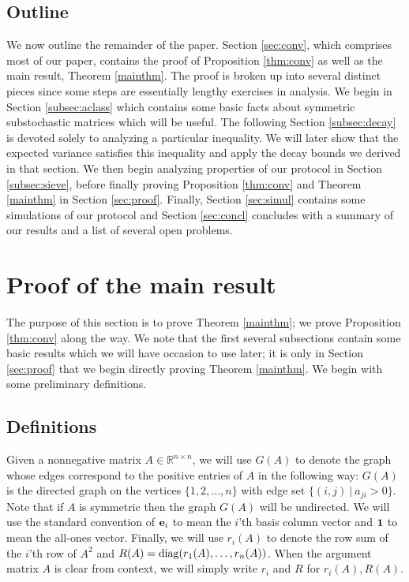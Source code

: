 \documentclass[final]{siamltex}
\begin{document}
\subsection{Outline} We now outline the remainder of the paper. Section \ref{sec:conv}, which comprises most of our paper, contains the proof of Proposition \ref{thm:conv} as well as the main result, Theorem \ref{mainthm}. The proof is broken up into several distinct pieces since some steps 
are essentially lengthy exercises in analysis. We begin in Section \ref{subsec:aclass} which contains some basic facts about symmetric substochastic
matrices which will be useful. The following Section \ref{subsec:decay} is devoted solely to analyzing a particular inequality. We will later show 
that the expected variance satisfies this inequality and apply the decay bounds we derived in that section.  We 
then begin analyzing properties of our protocol in Section \ref{subsec:sieve}, before finally proving Proposition \ref{thm:conv} and Theorem \ref{mainthm} in Section \ref{sec:proof}.  Finally, Section \ref{sec:simul} contains some simulations of our protocol and
Section \ref{sec:concl} concludes with a summary of our results and a list of several open problems. 
 
 
\section{Proof of the main result\label{sec:conv}} 

The purpose of this section is to prove Theorem \ref{mainthm}; we prove Proposition \ref{thm:conv} along the way.  
We note that the first several subsections contain some basic results which
we will have occasion to use later; it is only in Section \ref{sec:proof} that we begin directly proving Theorem \ref{mainthm}.
We begin with some preliminary definitions. 

 

\subsection{Definitions}
Given a nonnegative matrix $A \in {\mathbb{R}}^{n \times n}$, we will use $G(A)$ to
denote the graph whose edges correspond to the positive entries of $A$ in the following way: $G(A)$ is the directed graph on the vertices
$\{1,2, \ldots, n\}$ with edge set $\{ (i,j) ~|~ a_{ji}>0 \}$.  Note that if $A$ is symmetric then the graph $G(A)$ will be {{{undirected}}}. We will use the standard convention of ${{\bf e}}_i$ to mean
the $i$'th basis column vector and ${{\bf 1}}$ to mean the all-ones vector. Finally, we will use $r_i(A)$ to denote the row sum of the $i$'th row of $A^2$ and $R(A)={\rm diag}(r_1(A), \ldots,r_n(A))$. When the argument matrix $A$ is clear from context, we will simply write $r_i$ and $R$ for $r_i(A), R(A)$. 
\end{document}
